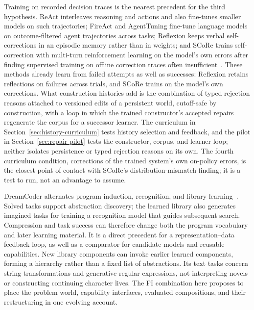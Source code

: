 \documentclass[10pt]{article}
\begin{document}
Training on recorded decision traces is the nearest precedent for the third
hypothesis. ReAct interleaves reasoning and actions and also fine-tunes smaller
models on such trajectories; FireAct and AgentTuning fine-tune language models
on outcome-filtered agent trajectories across tasks; Reflexion keeps
verbal self-corrections in an episodic memory rather than in weights; and
SCoRe trains self-correction with multi-turn reinforcement learning on the
model's own errors after finding supervised training on offline correction
traces often
insufficient~\cite{yao2023react,chen2023fireact,zeng2023agenttuning,shinn2023reflexion,kumar2024selfcorrect}.
These methods already learn from failed attempts as well as successes:
Reflexion retains reflections on failures across trials, and SCoRe trains on
the model's own corrections. What construction histories add is the
combination of typed rejection reasons attached to versioned edits of a
persistent world, cutoff-safe by construction, with a loop in which the trained
constructor's accepted repairs regenerate the corpus for a successor learner.
The curriculum in Section~\ref{sec:history-curriculum} tests history selection
and feedback, and the pilot in Section~\ref{sec:repair-pilot} tests the
constructor, corpus, and learner loop; neither isolates persistence or typed
rejection reasons on its own. The fourth curriculum
condition, corrections of the trained system's own on-policy errors, is the
closest point of contact with SCoRe's distribution-mismatch finding; it is a
test to run, not an advantage to assume.

DreamCoder alternates program induction, recognition, and library
learning~\cite{ellis2021dreamcoder}. Solved tasks support abstraction discovery;
the learned library also generates imagined tasks for training a recognition
model that guides subsequent search. Compression and task success can therefore
change both the program vocabulary and later learning material. It is a direct
precedent for a representation--data feedback loop, as well as a comparator for
candidate models and reusable capabilities. New library components can invoke
earlier learned components, forming a hierarchy rather than a fixed list of
abstractions. Its text tasks concern string transformations and generative
regular expressions, not interpreting novels or constructing continuing
character lives. The FI combination here proposes
to place the problem world,
capability interfaces, evaluated compositions, and their restructuring in one
evolving account.
\end{document}
